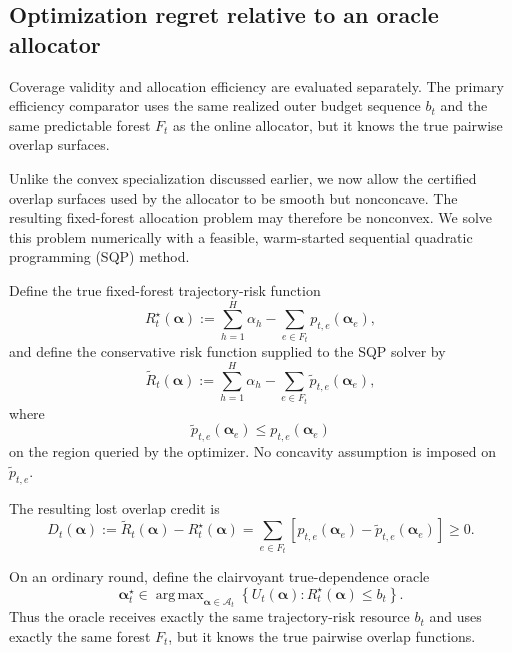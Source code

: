 \documentclass[11pt]{article}
\DeclareMathOperator*{\argmax}{arg\,max}
\begin{document}
\subsection{Optimization regret relative to an oracle allocator}
\label{sec:optimization-regret}

Coverage validity and allocation efficiency are evaluated separately.  The
primary efficiency comparator uses the same realized outer budget sequence
$b_t$ and the same predictable forest $F_t$ as the online allocator, but it
knows the true pairwise overlap surfaces.

Unlike the convex specialization discussed earlier, we now allow the certified
overlap surfaces used by the allocator to be smooth but nonconcave.  The
resulting fixed-forest allocation problem may therefore be nonconvex.  We solve
this problem numerically with a feasible, warm-started sequential quadratic
programming (SQP) method.

Define the true fixed-forest trajectory-risk function
\begin{equation}
    R_t^\star(\bm\alpha)
    :=
    \sum_{h=1}^{H}\alpha_h
    -
    \sum_{e\in F_t}
    p_{t,e}(\bm\alpha_e),
    \label{eq:true-fixed-forest-risk}
\end{equation}
and define the conservative risk function supplied to the SQP solver by
\begin{equation}
    \widetilde R_t(\bm\alpha)
    :=
    \sum_{h=1}^{H}\alpha_h
    -
    \sum_{e\in F_t}
    \widetilde p_{t,e}(\bm\alpha_e),
    \label{eq:sqp-certified-risk}
\end{equation}
where
\[
    \widetilde p_{t,e}(\bm\alpha_e)
    \le
    p_{t,e}(\bm\alpha_e)
\]
on the region queried by the optimizer.  No concavity assumption is imposed
on $\widetilde p_{t,e}$.

The resulting lost overlap credit is
\begin{equation}
\boxed{
    D_t(\bm\alpha)
    :=
    \widetilde R_t(\bm\alpha)
    -
    R_t^\star(\bm\alpha)
    =
    \sum_{e\in F_t}
    \left[
        p_{t,e}(\bm\alpha_e)
        -
        \widetilde p_{t,e}(\bm\alpha_e)
    \right]
    \ge 0.
}
\label{eq:lost-overlap-credit}
\end{equation}

On an ordinary round, define the clairvoyant true-dependence oracle
\begin{equation}
    \bm\alpha_t^\star
    \in
    \argmax_{\bm\alpha\in\mathcal A_t}
    \left\{
        U_t(\bm\alpha):
        R_t^\star(\bm\alpha)\le b_t
    \right\}.
    \label{eq:true-dependence-oracle}
\end{equation}
Thus the oracle receives exactly the same trajectory-risk resource $b_t$ and
uses exactly the same forest $F_t$, but it knows the true pairwise overlap
functions.
\end{document}
